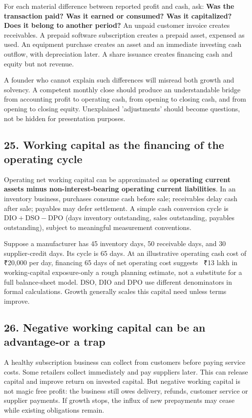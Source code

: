 For each material difference between reported profit and cash, ask: \textbf{Was the transaction paid? Was it earned or consumed? Was it capitalized? Does it belong to another period?} An unpaid customer invoice creates receivables. A prepaid software subscription creates a prepaid asset, expensed as used. An equipment purchase creates an asset and an immediate investing cash outflow, with depreciation later. A share issuance creates financing cash and equity but not revenue.

A founder who cannot explain such differences will misread both growth and solvency. A competent monthly close should produce an understandable bridge from accounting profit to operating cash, from opening to closing cash, and from opening to closing equity. Unexplained 'adjustments' should become questions, not be hidden for presentation purposes.

\subsection{25. Working capital as the financing of the operating cycle}


Operating net working capital can be approximated as \textbf{operating current assets minus non-interest-bearing operating current liabilities}. In an inventory business, purchases consume cash before sale; receivables delay cash after sale; payables may defer settlement. A simple cash conversion cycle is $\mathrm{DIO} + \mathrm{DSO} - \mathrm{DPO}$ (days inventory outstanding, sales outstanding, payables outstanding), subject to meaningful measurement conventions.

Suppose a manufacturer has 45 inventory days, 50 receivable days, and 30 supplier-credit days. Its cycle is 65 days. At an illustrative operating cash cost of ₹20,000 per day, financing 65 days of net operating cost suggests ~₹13 lakh in working-capital exposure-only a rough planning estimate, not a substitute for a full balance-sheet model. DSO, DIO and DPO use different denominators in formal calculations. Growth generally scales this capital need unless terms improve.

\subsection{26. Negative working capital can be an advantage-or a trap}


A healthy subscription business can collect from customers before paying service costs. Some retailers collect immediately and pay suppliers later. This can release capital and improve return on invested capital. But negative working capital is not magic free profit: the business still owes delivery, refunds, customer service or supplier payments. If growth stops, the influx of new prepayments may cease while existing obligations remain.

